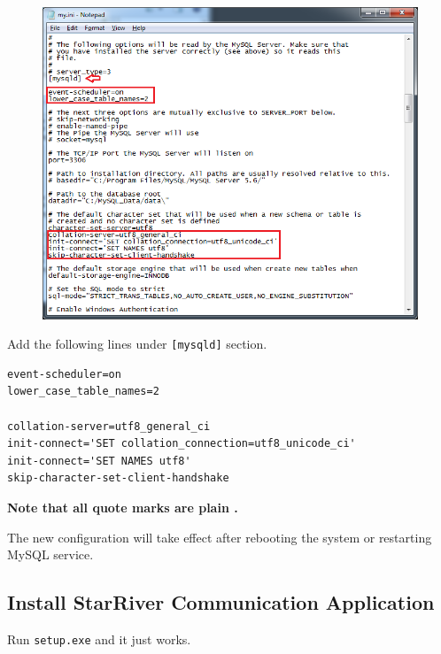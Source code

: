 \begin{figure}[htbp]
\centering
\includegraphics{img/my_ini.png}
\caption{}
\end{figure}

Add the following lines under \texttt{{[}mysqld{]}} section.

\begin{verbatim}
event-scheduler=on
lower_case_table_names=2

collation-server=utf8_general_ci
init-connect='SET collation_connection=utf8_unicode_ci'
init-connect='SET NAMES utf8'
skip-character-set-client-handshake
\end{verbatim}

\textbf{Note that all quote marks are plain
\texttt{\textquotesingle{}}.}

The new configuration will take effect after rebooting the system or
restarting MySQL service.

\subsection{Install StarRiver Communication
Application}\label{install-starriver-communication-application}

Run \texttt{setup.exe} and it just works.

